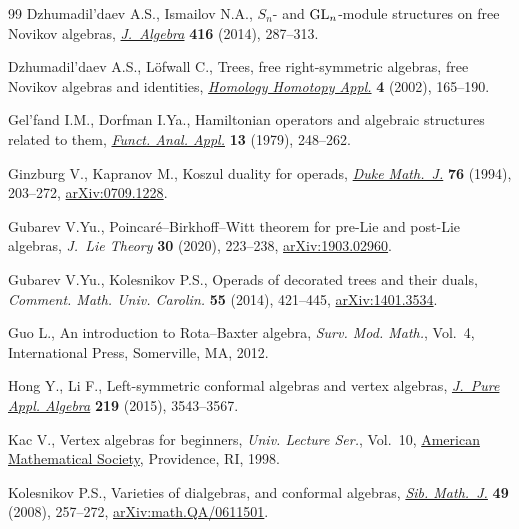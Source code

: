 \documentclass[pdftex]{sigma}
\numberwithin{equation}{section}
\begin{document}
\begin{thebibliography}{99}
Dzhumadil'daev A.S., Ismailov N.A., {$S_n$}- and {${\rm GL}_n$}-module
 structures on free {N}ovikov algebras, \href{https://doi.org/10.1016/j.jalgebra.2014.06.013}{\textit{J.~Algebra}} \textbf{416}
 (2014), 287--313.

Dzhumadil'daev A.S., L\"ofwall C., Trees, free right-symmetric algebras, free
 {N}ovikov algebras and identities, \href{https://doi.org/10.4310/hha.2002.v4.n2.a8}{\textit{Homology Homotopy Appl.}}
 \textbf{4} (2002), 165--190.

Gel'fand I.M., Dorfman I.Ya., Hamiltonian operators and algebraic structures
 related to them, \href{https://doi.org/10.1007/BF01078363}{\textit{Funct. Anal. Appl.}} \textbf{13} (1979), 248--262.

Ginzburg V., Kapranov M., Koszul duality for operads, \href{https://doi.org/10.1215/S0012-7094-94-07608-4}{\textit{Duke Math.~J.}}
 \textbf{76} (1994), 203--272, \href{https://arxiv.org/abs/0709.1228}{arXiv:0709.1228}.

Gubarev V.Yu., Poincar\'e--{B}irkhoff--{W}itt theorem for pre-{L}ie and post-{L}ie
 algebras, \textit{J.~Lie Theory} \textbf{30} (2020), 223--238,
 \href{https://arxiv.org/abs/1903.02960}{arXiv:1903.02960}.

Gubarev V.Yu., Kolesnikov P.S., Operads of decorated trees and their duals,
 \textit{Comment. Math. Univ. Carolin.} \textbf{55} (2014), 421--445,
 \href{https://arxiv.org/abs/1401.3534}{arXiv:1401.3534}.

Guo L., An introduction to {R}ota--{B}axter algebra, \textit{Surv. Mod. Math.},
 Vol.~4, International Press, Somerville, MA, 2012.

Hong Y., Li F., Left-symmetric conformal algebras and vertex algebras,
 \href{https://doi.org/10.1016/j.jpaa.2014.12.012}{\textit{J.~Pure Appl. Algebra}} \textbf{219} (2015), 3543--3567.

Kac V., Vertex algebras for beginners, \textit{Univ. Lecture Ser.}, Vol.~10,
 \href{https://doi.org/10.1090/ulect/010}{American Mathematical Society}, Providence, RI, 1998.

Kolesnikov P.S., Varieties of dialgebras, and conformal algebras, \href{https://doi.org/10.1007/s11202-008-0026-8}{\textit{Sib.
 Math.~J.}} \textbf{49} (2008), 257--272, \href{https://arxiv.org/abs/math.QA/0611501}{arXiv:math.QA/0611501}.


\end{thebibliography}
\end{document}
